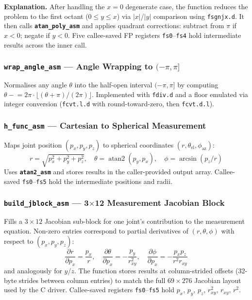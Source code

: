 \documentclass[12pt,a4paper]{article}
\newcommand{\reg}[1]{\texttt{\color{reg}#1}}
\newcommand{\insn}[1]{\texttt{\color{keyword}#1}}
\newcommand{\func}[1]{\texttt{\bfseries #1}}
\begin{document}
\textbf{Explanation.}
After handling the $x=0$ degenerate case, the function reduces the
problem to the first octant ($0 \le y \le x$) via $|x|$/$|y|$
comparison using \insn{fsgnjx.d}. It then calls
\func{atan\_poly\_asm} and applies quadrant corrections: subtract
from $\pi$ if $x < 0$; negate if $y < 0$. Five callee-saved FP
registers \reg{fs0}--\reg{fs4} hold intermediate results across the
inner call.

\subsubsection{\func{wrap\_angle\_asm} --- Angle Wrapping to $(-\pi, \pi]$}

Normalises any angle $\theta$ into the half-open interval
$(-\pi,\pi]$ by computing $\theta \mathrel{-}= 2\pi \cdot
\lfloor(\theta + \pi)/(2\pi)\rfloor$. Implemented with
\insn{fdiv.d} and a floor emulated via integer conversion (\insn{fcvt.l.d}
with round-toward-zero, then \insn{fcvt.d.l}).

\subsubsection{\func{h\_func\_asm} --- Cartesian to Spherical Measurement}

Maps joint position $(p_x, p_y, p_z)$ to spherical coordinates
$(r, \theta_{\text{el}}, \phi_{\text{az}})$:
\[
  r = \sqrt{p_x^2+p_y^2+p_z^2}, \quad
  \theta = \operatorname{atan2}(p_y, p_x), \quad
  \phi   = \arcsin(p_z / r)
\]
Uses \func{atan2\_asm} and stores results in the caller-provided
output array. Callee-saved \reg{fs0}--\reg{fs5} hold the
intermediate positions and radii.

\subsubsection{\func{build\_jblock\_asm} --- 3$\times$12 Measurement Jacobian Block}

Fills a $3 \times 12$ Jacobian sub-block for one joint's contribution
to the measurement equation. Non-zero entries correspond to partial
derivatives of $(r, \theta, \phi)$ with respect to $(p_x, p_y, p_z)$:
\[
  \frac{\partial r}{\partial p_x} = \frac{p_x}{r}, \quad
  \frac{\partial \theta}{\partial p_x} = -\frac{p_y}{r_{xy}^2}, \quad
  \frac{\partial \phi}{\partial p_x} = -\frac{p_x p_z}{r^2 r_{xy}}
\]
and analogously for $y$/$z$. The function stores results at
column-strided offsets (32-byte strides between column entries) to
match the full $69\times276$ Jacobian layout used by the C driver.
Callee-saved registers \reg{fs0}--\reg{fs5} hold $p_x$, $p_y$,
$p_z$, $r_{xy}^2$, $r_{xy}$, $r^2$.
\end{document}
